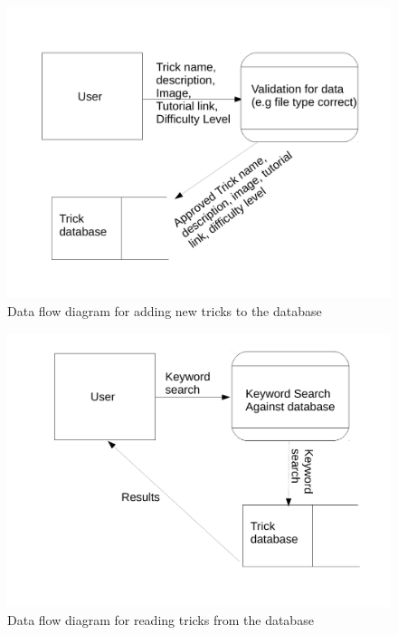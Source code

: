 \begin{figure}[H]
    \includegraphics[width=\textwidth]{./Analysis/AddingTricksToDatabase.pdf}
    \caption{Data flow diagram for adding new tricks to the database} \label{fig:Adding tricks to database}
\end{figure}



\begin{figure}[H]
    \includegraphics[width=\textwidth]{./Analysis/ReadingTricksFromDatabase.pdf}
    \caption{Data flow diagram for reading tricks from the database} \label{fig:Reading tricks from database}
\end{figure}



